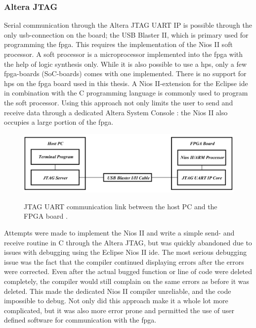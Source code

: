 \documentclass[main.tex]{subfiles}
\begin{document}
\subsubsection{Altera JTAG}
Serial communication through the Altera JTAG UART IP is possible through the only \acrshort{usb}-connection on the board; the USB Blaster II, which is primary used for programming the \gls{fpga}. This requires the implementation of the Nios II soft processor. A soft processor is a microprocessor implemented into the \gls{fpga} with the help of logic synthesis only. While it is also possible to use a \gls{hps}, only a few \gls{fpga}-boards (SoC-boards) comes with one implemented. There is no support for \gls{hps} on the \gls{fpga} board used in this thesis. A Nios II-extension for the Eclipse \acrshort{ide} in combination with the C programming language is commonly used to program the soft processor. Using this approach not only limits the user to send and receive data through a dedicated Altera System Console \cite{altera_terminals14}: the Nios II also occupies a large portion of the \gls{fpga}.

\begin{figure}[H] %
\includegraphics[width = 12 cm]{../img/altera_jtag}  \\[0.1 cm]
\caption{JTAG UART communication link between the host PC and the FPGA board \cite[Figure 1]{altera_terminals14}.}
\label{fig:altjtag}
\end{figure}

Attempts were made to implement the Nios II and write a simple send- and receive routine in C through the Altera JTAG, but was quickly abandoned due to issues with debugging using the Eclipse Nios II \acrshort{ide}. The most serious debugging issue was the fact that the compiler continued displaying errors after the errors were corrected. Even after the actual bugged function or line of code were deleted completely, the compiler would still complain on the same errors as before it was deleted. This made the dedicated Nios II compiler unreliable, and the code impossible to debug. Not only did this approach make it a whole lot more complicated, but it was also more error prone and permitted the use of user defined software for communication with the \gls{fpga}.
\end{document}
